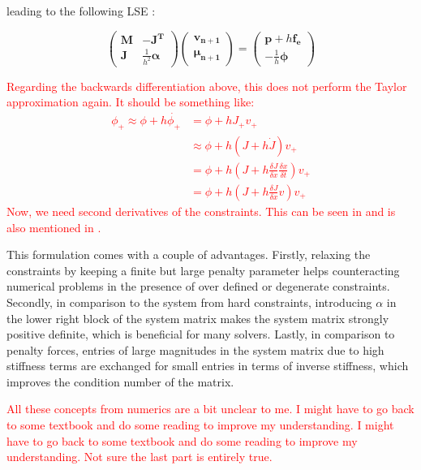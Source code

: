\documentclass{article}
\begin{document}
leading to the following LSE \cite{tournier2015}:

\[
\begin{pmatrix}
    \bm{M} & \bm{-J^T} \\
    \bm{J} & \frac{1}{h^2}\bm{\alpha}
\end{pmatrix}
\begin{pmatrix}
    \bm{v_{n+1}} \\
    \bm{\mu_{n+1}}
\end{pmatrix}
=
\begin{pmatrix}
    \bm{p} + h\bm{f_e} \\
    - \frac{1}{h}\bm{\phi}
\end{pmatrix}
\]

\textcolor{red}{Regarding the backwards differentiation above, this does not perform the Taylor approximation again. It should be something
like:
\begin{align*}
    \phi_+ \approx \phi + h\dot{\phi_+} &= \phi + hJ_+v_+ \\
                                        &\approx \phi + h(J + h\dot{J})v_+ \\
                                        &= \phi + h(J + h\frac{\delta J}{\delta x}\frac{\delta x}{\delta t})v_+ \\
                                        &= \phi + h(J + h\frac{\delta J}{\delta x}v)v_+
\end{align*}
Now, we need second derivatives of the constraints. This can be seen in \cite{baraff1998} and is also mentioned in \cite{servin2006}.
}

This formulation comes with a couple of advantages. Firstly, relaxing the constraints by keeping a finite but large penalty parameter helps
counteracting numerical problems in the presence of over defined or degenerate constraints. Secondly, in comparison to the system from hard
constraints, introducing $\alpha$ in the lower right block of the system matrix makes the system matrix strongly positive definite, which 
is beneficial for many solvers. Lastly, in comparison to penalty forces, entries of large magnitudes in the system matrix due to high 
stiffness terms are exchanged for small entries in terms of inverse stiffness, which improves the condition number of the matrix. 

\textcolor{red}{
    All these concepts from numerics are a bit unclear to me. I might have to go back to some textbook and do some reading to improve my understanding. 
    I might have to go back to some textbook and do some reading to improve my understanding. Not sure the last part is entirely true.}
\end{document}
